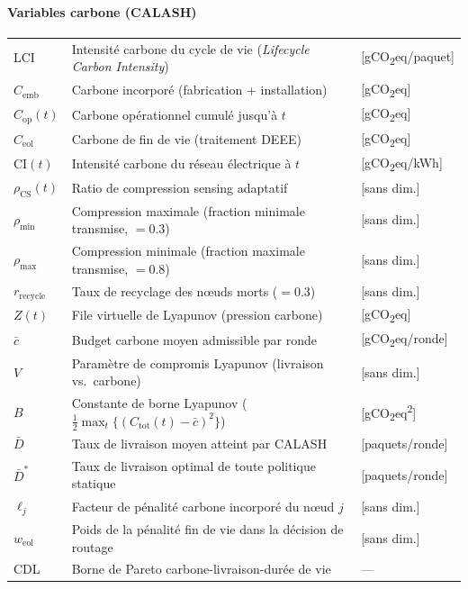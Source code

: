\paragraph{Variables carbone (CALASH)}
\begin{longtable}{lp{3in}l}
LCI & Intensité carbone du cycle de vie (\emph{Lifecycle Carbon Intensity}) & [gCO\textsubscript{2}eq/paquet] \\
$C_{\text{emb}}$ & Carbone incorporé (fabrication + installation) & [gCO\textsubscript{2}eq] \\
$C_{\text{op}}(t)$ & Carbone opérationnel cumulé jusqu'à $t$ & [gCO\textsubscript{2}eq] \\
$C_{\text{eol}}$ & Carbone de fin de vie (traitement DEEE) & [gCO\textsubscript{2}eq] \\
CI$(t)$ & Intensité carbone du réseau électrique à $t$ & [gCO\textsubscript{2}eq/kWh] \\
$\rho_{\text{CS}}(t)$ & Ratio de compression sensing adaptatif & [sans dim.] \\
$\rho_{\min}$ & Compression maximale (fraction minimale transmise, $= 0.3$) & [sans dim.] \\
$\rho_{\max}$ & Compression minimale (fraction maximale transmise, $= 0.8$) & [sans dim.] \\
$r_{\text{recycle}}$ & Taux de recyclage des nœuds morts ($= 0.3$) & [sans dim.] \\
$Z(t)$ & File virtuelle de Lyapunov (pression carbone) & [gCO\textsubscript{2}eq] \\
$\bar{c}$ & Budget carbone moyen admissible par ronde & [gCO\textsubscript{2}eq/ronde] \\
$V$ & Paramètre de compromis Lyapunov (livraison vs.~carbone) & [sans dim.] \\
$B$ & Constante de borne Lyapunov ($\frac{1}{2}\max_t\{(C_{\text{tot}}(t)-\bar{c})^2\}$) & [gCO\textsubscript{2}eq\textsuperscript{2}] \\
$\bar{D}$ & Taux de livraison moyen atteint par CALASH & [paquets/ronde] \\
$\bar{D}^*$ & Taux de livraison optimal de toute politique statique & [paquets/ronde] \\
$\ell_j$ & Facteur de pénalité carbone incorporé du nœud $j$ & [sans dim.] \\
$w_{\text{eol}}$ & Poids de la pénalité fin de vie dans la décision de routage & [sans dim.] \\
CDL & Borne de Pareto carbone-livraison-durée de vie & --- \\
\end{longtable}


